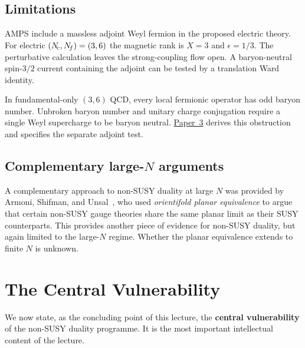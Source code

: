 \documentclass[11pt,a4paper]{article}
\begin{document}
\subsection{Limitations}

\begin{warningbox}[title={Which six-flavour theory?}]
  AMPS include a massless adjoint Weyl fermion in the proposed
  electric theory. For electric $(N_{\!c},N_{\!f})=(3,6)$ the magnetic rank
  is $X=3$ and $\epsilon=1/3$. The perturbative calculation leaves
  the strong-coupling flow open. A baryon-neutral spin-$3/2$ current
  containing the adjoint can be tested by a translation Ward identity.

  \medskip

  In fundamental-only $(3,6)$ QCD, every local fermionic operator
  has odd baryon number. Unbroken baryon number and unitary charge
  conjugation require a single Weyl supercharge to be baryon neutral.
  \href{https://github.com/arivero/dualsm/blob/master/papers/paper-3-emergent-susy-lattice/paper.pdf}{Paper~3}
  derives this obstruction and specifies the separate adjoint test.
\end{warningbox}

\subsection{Complementary large-$N$ arguments}

A complementary approach to non-SUSY duality at large $N$ was
provided by Armoni, Shifman, and Unsal~\cite{ASU2008}, who used
\emph{orientifold planar equivalence} to argue that certain non-SUSY
gauge theories share the same planar limit as their SUSY counterparts.
This provides another piece of evidence for non-SUSY duality, but
again limited to the large-$N$ regime.  Whether the planar equivalence
extends to finite $N$ is unknown.


\section{The Central Vulnerability}
\label{sec:vulnerability}

We now state, as the concluding point of this lecture, the
\textbf{central vulnerability} of the non-SUSY duality programme.
It is the most important intellectual content of the lecture.
\end{document}
